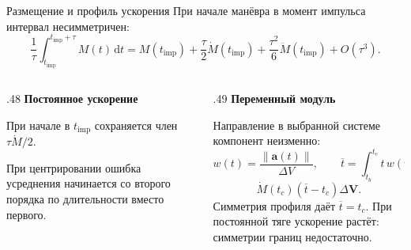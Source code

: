 \documentclass[11pt,aspectratio=169,t]{beamer}
\newcommand{\eqcompact}{\fontsize{10}{12}\selectfont}
\newcommand{\derivationmathspacing}{%
  \setlength{\abovedisplayskip}{2pt}%
  \setlength{\belowdisplayskip}{3pt}%
  \setlength{\abovedisplayshortskip}{2pt}%
  \setlength{\belowdisplayshortskip}{2pt}%
  \setlength{\jot}{2pt}}
\newcommand{\vect}[1]{\boldsymbol{#1}}
\begin{document}
\begin{frame}{Размещение и профиль ускорения}
\relax\derivationmathspacing
При начале манёвра в момент импульса интервал несимметричен:
{\eqcompact\derivationmathspacing
\[
 \frac1\tau\int_{t_{\mathrm{imp}}}^{t_{\mathrm{imp}}+\tau}M(t)\,\mathrm dt
 =M(t_{\mathrm{imp}})+\frac\tau2\dot M(t_{\mathrm{imp}})
 +\frac{\tau^2}{6}\ddot M(t_{\mathrm{imp}})+O(\tau^3).
\]
}
\begin{columns}[T,onlytextwidth]
\begin{column}{.48\textwidth}
\textbf{Постоянное ускорение}
\par\smallskip
При начале в $t_{\mathrm{imp}}$ сохраняется член $\tau\dot M/2$.
\par\smallskip
При центрировании ошибка усреднения начинается со второго порядка по длительности вместо первого.
\end{column}
\begin{column}{.49\textwidth}
\textbf{Переменный модуль}
\par
Направление в выбранной системе компонент неизменно:
{\eqcompact\derivationmathspacing
\[
 w(t)=\frac{\|\vect a(t)\|}{\Delta V},\qquad
 \overline t=\int_{t_b}^{t_e}t\,w(t)\,\mathrm dt.
\]
}
{\eqcompact\derivationmathspacing
\[
 \dot M(t_c)(\overline t-t_c)\Delta\vect V.
\]
}
Симметрия профиля даёт $\overline t=t_c$. При постоянной тяге ускорение растёт: симметрии границ недостаточно.
\end{column}
\end{columns}
\end{frame}
\end{document}
